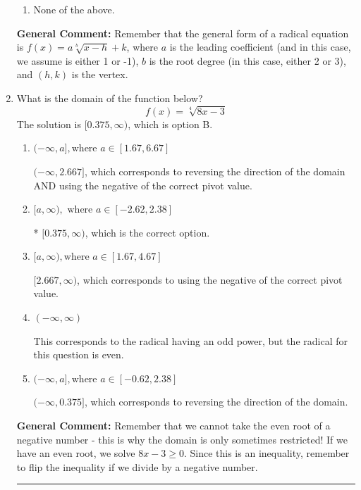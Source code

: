 \documentclass{extbook}[14pt]
\newcommand{\litem}[1]{\item #1

\rule{\textwidth}{0.4pt}}
\begin{document}
\begin{enumerate}
{\begin{enumerate}[label=\Alph*.]
\item None of the above.\end{enumerate}
\textbf{General Comment:} Remember that the general form of a radical equation is $ f(x) = a \sqrt[b]{x - h} + k $, where $a$ is the leading coefficient (and in this case, we assume is either 1 or -1), $b$ is the root degree (in this case, either 2 or 3), and $(h, k)$ is the vertex.
}
\litem{
What is the domain of the function below?
\[ f(x) = \sqrt[4]{8 x - 3} \]The solution is \( [0.375, \infty) \), which is option B.\begin{enumerate}[label=\Alph*.]
\item \( (-\infty, a], \text{where } a \in [1.67, 6.67] \)

$(-\infty, 2.667]$, which corresponds to reversing the direction of the domain AND using the negative of the correct pivot value.
\item \( [a, \infty), \text{ where } a \in [-2.62, 2.38] \)

* $[0.375, \infty)$, which is the correct option.
\item \( [a, \infty), \text{where } a \in [1.67, 4.67] \)

$[2.667, \infty)$, which corresponds to using the negative of the correct pivot value.
\item \( (-\infty, \infty) \)

This corresponds to the radical having an odd power, but the radical for this question is even.
\item \( (-\infty, a], \text{where } a \in [-0.62, 2.38] \)

 $(-\infty, 0.375]$, which corresponds to reversing the direction of the domain.
\end{enumerate}

\textbf{General Comment:} Remember that we cannot take the even root of a negative number - this is why the domain is only sometimes restricted! If we have an even root, we solve $8 x - 3 \geq 0$. Since this is an inequality, remember to flip the inequality if we divide by a negative number.
}
\end{enumerate}
\end{document}
